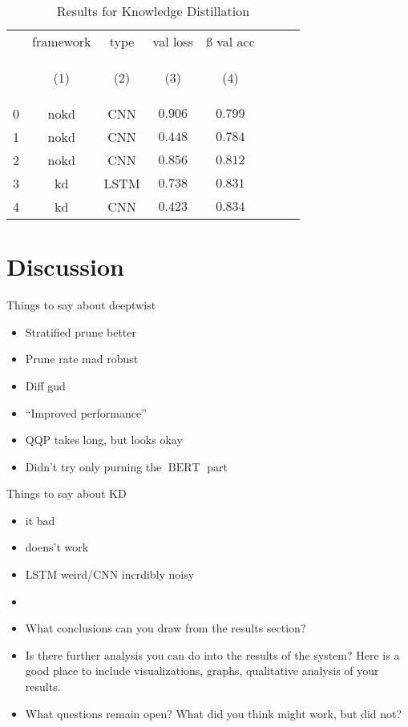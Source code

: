 \documentclass[10pt]{article}
\newcommand{\bert}{\operatorname{BERT}}
\begin{document}
\begin{table}[tbh]
        \caption{Results for Knowledge Distillation}
        \label{tab:kd_results}
        \centering
        \vspace{1em}
        \begin{tabular}{lccccccc}
\toprule
{} &  framework &  type &  val loss &  ß val acc \\
{} & \hypertarget{tabcol:1}{(1)} & \hypertarget{tabcol:2}{(2)} & \hypertarget{tabcol:3}{(3)} & \hypertarget{tabcol:4}{(4)} \\
\midrule
0 &        nokd &   CNN &   $0.906$ &   $0.799$ \\
1 &        nokd &   CNN &   $0.448$ &   $0.784$ \\
2 &        nokd &   CNN &   $0.856$ &   $0.812$ \\
3 &          kd &  LSTM &   $0.738$ &   $0.831$ \\
4 &          kd &   CNN &   $0.423$ &   $0.834$ \\
\bottomrule
\end{tabular}

\end{table}

\section{Discussion}
Things to say about deeptwist
\begin{itemize}
  \item Stratified prune better
  \item Prune rate mad robust
  \item Diff gud
  \item ``Improved performance''
  \item QQP takes long, but looks okay
  \item Didn't try only purning the $\bert$ part
\end{itemize}

Things to say about KD
\begin{itemize}
  \item it bad
  \item doens't work
  \item LSTM weird/CNN incrdibly noisy
  \item {}
\end{itemize}

\begin{itemize}
\item What conclusions can you draw from the results section?
\item Is there further analysis you can do into the results of the system? Here is a good place to include visualizations, graphs, qualitative analysis of your results.

\item  What questions remain open? What did you think might work, but did not?
\end{itemize}
\end{document}
